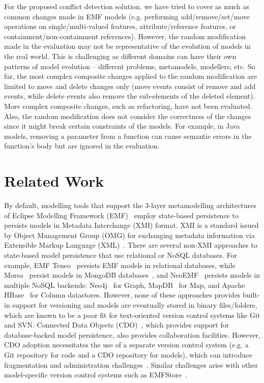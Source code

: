 For the proposed conflict detection solution, we have tried to cover as much as common changes made in EMF models (e.g. performing \textsf{add}/\textsf{remove}/\textsf{set}/\textsf{move} operations on \textsf{single}/\textsf{multi}-\textsf{valued} features, \textsf{attribute}/\textsf{reference} features, or \textsf{containment}/\textsf{non}-\textsf{containment} references). However, the random modification made in the evaluation may not be representative of the evolution of models in the real world. This is challenging as different domains can have their own patterns of model evolution -- different problems, metamodels, modellers, etc. So far, the most complex composite changes applied to the random modification are limited to \textsf{move} and \textsf{delete} changes only (\textsf{move} events consist of \textsf{remove} and \textsf{add} events, while \textsf{delete} events also remove the sub-elements of the deleted element). More complex composite changes, such as refactoring, have not been evaluated. Also, the random modification does not consider the correctness of the changes since it might break certain constraints of the models. For example, in Java~\cite{eclipse2018modiscojava} models, removing a parameter from a function can cause semantic errors in the function's body but are ignored in the evaluation. 

\section{Related Work}
\label{sec:related_work}
By default, modelling tools that support the 3-layer metamodelling architectures of Eclipse Modelling Framework (EMF)~\cite{steinberg2008emf} employ state-based persistence to persists models in Metadata Interchange (XMI) format. XMI is a standard issued by Object Management Group (OMG) for exchanging metadata information via Extensible Markup Language (XML)~\cite{omg2018xmi}. There are several non-XMI approaches to state-based model persistence that use relational or NoSQL databases. For example, EMF Teneo~\cite{eclipse2017teneo} persists EMF models in relational databases, while Morsa~\cite{DBLP:conf/models/Espinazo-PaganCM11} persist models in MongoDB databases~\cite{mongodb}, and NeoEMF~\cite{daniel2016neoemf} persists models in multiple NoSQL backends: Neo4j~\cite{neo4j2019neo4j} for Graph, MapDB~\cite{mapdb2019mapdb} for Map, and Apache HBase~\cite{apache2019hbase} for Column datastores. However, none of these approaches provides built-in support for versioning and models are eventually stored in binary files/folders, which are known to be a poor fit for text-oriented version control systems like Git and SVN. Connected Data Objects (CDO)~\cite{eclipse2019cdo}, which provides support for database-backed model persistence, also provides collaboration facilities. However, CDO adoption necessitates the use of a separate version control system (e.g. a Git repository for code and a CDO repository for models), which can introduce fragmentation and administration challenges~\cite{barmpis2014evaluation}. Similar challenges arise with other model-specific version control systems such as EMFStore~\cite{koegel2010emfstore}.

